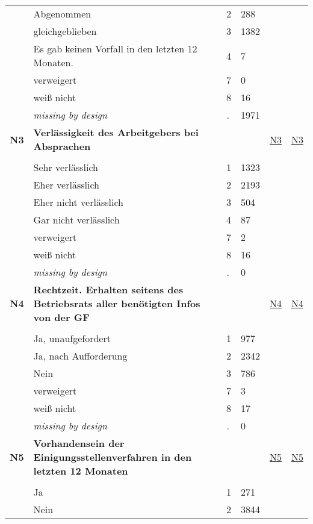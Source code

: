 \begin{longtable}{| L{2.45cm} | L{6cm} | C{1.5cm} | R{1cm} | C{2.25cm} | C{2.25cm} |}
   & Abgenommen & 2 & 288 &  &  \\ 
   & gleichgeblieben & 3 & 1382 &  &  \\ 
   & Es gab keinen Vorfall in den letzten 12 Monaten. & 4 & 7 &  &  \\ 
   & verweigert & 7 & 0 &  &  \\ 
   & weiß nicht & 8 & 16 &  &  \\ 
   & \textit{missing by design} & \textit{.} & 1971 &  &  \\ 
   \midrule
\textbf{N3}\label{var:N3} & \textbf{Verlässigkeit des Arbeitgebers bei Absprachen} &  &  & \hyperref[N3]{N3} & \hyperref[var:suf:N3]{N3} \\ 
   &  &  &  &  &  \\ 
   & Sehr verlässlich & 1 & 1323 &  &  \\ 
   & Eher verlässlich & 2 & 2193 &  &  \\ 
   & Eher nicht verlässlich & 3 & 504 &  &  \\ 
   & Gar nicht verlässlich & 4 & 87 &  &  \\ 
   & verweigert & 7 & 2 &  &  \\ 
   & weiß nicht & 8 & 16 &  &  \\ 
   & \textit{missing by design} & \textit{.} & 0 &  &  \\ 
   \midrule
\textbf{N4}\label{var:N4} & \textbf{Rechtzeit. Erhalten seitens des Betriebsrats aller benötigten Infos von der GF} &  &  & \hyperref[N4]{N4} & \hyperref[var:suf:N4]{N4} \\ 
   &  &  &  &  &  \\ 
   & Ja, unaufgefordert & 1 & 977 &  &  \\ 
   & Ja, nach Aufforderung & 2 & 2342 &  &  \\ 
   & Nein & 3 & 786 &  &  \\ 
   & verweigert & 7 & 3 &  &  \\ 
   & weiß nicht & 8 & 17 &  &  \\ 
   & \textit{missing by design} & \textit{.} & 0 &  &  \\ 
   \midrule
\textbf{N5}\label{var:N5} & \textbf{Vorhandensein der Einigungsstellenverfahren in den letzten 12 Monaten} &  &  & \hyperref[N5]{N5} & \hyperref[var:suf:N5]{N5} \\ 
   &  &  &  &  &  \\ 
   & Ja & 1 & 271 &  &  \\ 
   & Nein & 2 & 3844 &  &  \\ 

\end{longtable}
